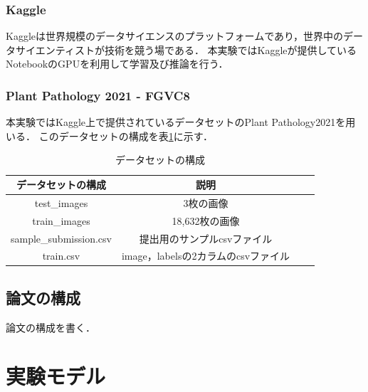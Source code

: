 \documentclass[a4paper, oneside, openany, dvipdfmx]{suribt}%
\newcommand{\tref}[1]{表\ref{#1}}
\begin{document}
\subsection{Kaggle}
Kaggleは世界規模のデータサイエンスのプラットフォームであり，世界中のデータサイエンティストが技術を競う場である．
本実験ではKaggleが提供しているNotebookのGPUを利用して学習及び推論を行う．
\subsection{Plant Pathology 2021 - FGVC8}
本実験ではKaggle上で提供されているデータセットのPlant Pathology2021を用いる．
このデータセットの構成を\tref{tb:dataset}に示す．
\begin{table}[htbp]
  \caption{データセットの構成}
  \label{tb:dataset}
  \centering\begin{tabular}{c|ccc}\hline
    データセットの構成 & 説明\\ \hline
    test\_images & 3枚の画像\\ \hline
    train\_images & 18,632枚の画像\\ \hline
    sample\_submission.csv & 提出用のサンプルcsvファイル\\ \hline
    train.csv & image，labelsの2カラムのcsvファイル\\ \hline
  \end{tabular}
\end{table}
\section{論文の構成}
論文の構成を書く．

\chapter{実験モデル}
\end{document}
